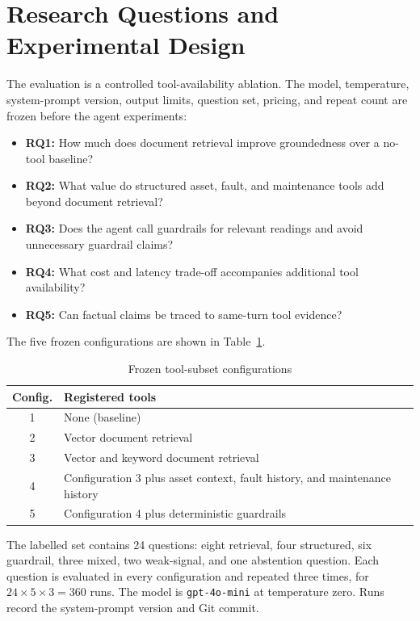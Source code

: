 \documentclass[conference]{IEEEtran}
\begin{document}
\section{Research Questions and Experimental Design}
The evaluation is a controlled tool-availability ablation. The model,
temperature, system-prompt version, output limits, question set, pricing,
and repeat count are frozen before the agent experiments:
\begin{itemize}
\item \textbf{RQ1:} How much does document retrieval improve groundedness
over a no-tool baseline?
\item \textbf{RQ2:} What value do structured asset, fault, and maintenance
tools add beyond document retrieval?
\item \textbf{RQ3:} Does the agent call guardrails for relevant readings and
avoid unnecessary guardrail claims?
\item \textbf{RQ4:} What cost and latency trade-off accompanies additional
tool availability?
\item \textbf{RQ5:} Can factual claims be traced to same-turn tool evidence?
\end{itemize}

The five frozen configurations are shown in Table~\ref{tab:configs}.

\begin{table}[t]
\caption{Frozen tool-subset configurations}
\label{tab:configs}
\centering
\footnotesize
\begin{tabular}{c p{}}
\toprule
Config. & Registered tools\\
\midrule
1 & None (baseline)\\
2 & Vector document retrieval\\
3 & Vector and keyword document retrieval\\
4 & Configuration 3 plus asset context, fault history, and maintenance history\\
5 & Configuration 4 plus deterministic guardrails\\
\bottomrule
\end{tabular}
\end{table}

The labelled set contains 24 questions: eight retrieval, four structured,
six guardrail, three mixed, two weak-signal, and one abstention question.
Each question is evaluated in every configuration and repeated three times,
for $24\times5\times3=360$ runs. The model is \texttt{gpt-4o-mini} at
temperature zero. Runs record the system-prompt version and Git commit.
\end{document}
